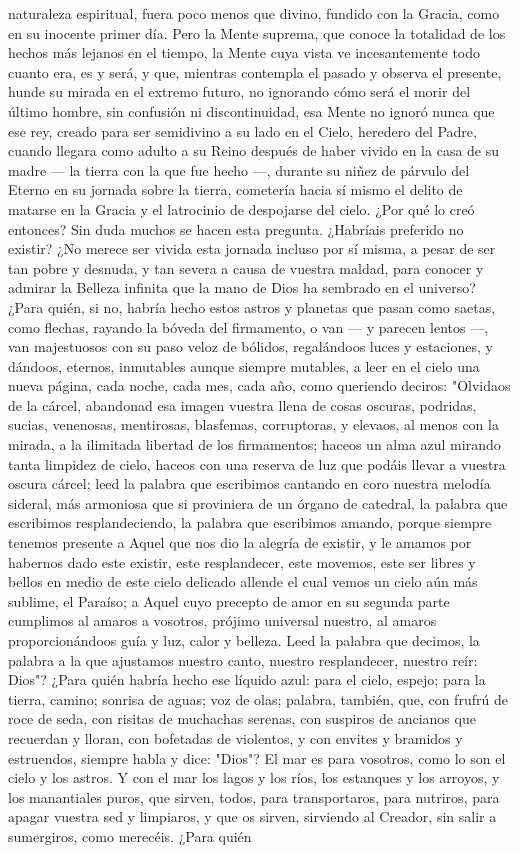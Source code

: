 \documentclass[12pt, twoside, openright]{book} %
\begin{document}
naturaleza espiritual, fuera poco menos que divino, fundido con la Gracia, como en su inocente primer día. Pero la Mente suprema, que conoce la totalidad de los hechos más lejanos en el tiempo, la Mente cuya vista ve incesantemente todo cuanto era, es y será, y que, mientras contempla el pasado y observa el presente, hunde su mirada en el extremo futuro, no ignorando cómo será el morir del último hombre, sin confusión ni discontinuidad, esa Mente no ignoró nunca que ese rey, creado para ser semidivino a su lado en el Cielo, heredero del Padre, cuando llegara como adulto a su Reino después de haber vivido en la casa de su madre — la tierra con la que fue hecho —, durante su niñez de párvulo del Eterno en su jornada sobre la tierra, cometería hacia sí mismo el delito de matarse en la Gracia y el latrocinio de despojarse del cielo. ¿Por qué lo creó entonces? Sin duda muchos se hacen esta pregunta. ¿Habríais preferido no existir? ¿No merece ser vivida esta jornada incluso por sí misma, a pesar de ser tan pobre y desnuda, y tan severa a causa de vuestra maldad, para conocer y admirar la Belleza infinita que la mano de Dios ha sembrado en el universo? ¿Para quién, si no, habría hecho estos astros y planetas que pasan como saetas, como flechas, rayando la bóveda del firmamento, o van — y parecen lentos —, van majestuosos con su paso veloz de bólidos, regalándoos luces y estaciones, y dándoos, eternos, inmutables aunque siempre mutables, a leer en el cielo una nueva página, cada noche, cada mes, cada año, como queriendo deciros: "Olvidaos de la cárcel, abandonad esa imagen vuestra llena de cosas oscuras, podridas, sucias, venenosas, mentirosas, blasfemas, corruptoras, y elevaos, al menos con la mirada, a la ilimitada libertad de los firmamentos; haceos un alma azul mirando tanta limpidez de cielo, haceos con una reserva de luz que podáis llevar a vuestra oscura cárcel; leed la palabra que escribimos cantando en coro nuestra melodía sideral, más armoniosa que si proviniera de un órgano de catedral, la palabra que escribimos resplandeciendo, la palabra que escribimos amando, porque siempre tenemos presente a Aquel que nos dio la alegría de existir, y le amamos por habernos dado este existir, este resplandecer, este movemos, este ser libres y bellos en medio de este cielo delicado allende el cual vemos un cielo aún más sublime, el Paraíso; a Aquel cuyo precepto de amor en su segunda parte cumplimos al amaros a vosotros, prójimo universal nuestro, al amaros proporcionándoos guía y luz, calor y belleza. Leed la palabra que decimos, la palabra a la que ajustamos nuestro canto, nuestro resplandecer, nuestro reír: Dios"? ¿Para quién habría hecho ese líquido azul: para el cielo, espejo; para la tierra, camino; sonrisa de aguas; voz de olas; palabra, también, que, con frufrú de roce de seda, con risitas de muchachas serenas, con suspiros de ancianos que recuerdan y lloran, con bofetadas de violentos, y con envites y bramidos y estruendos, siempre habla y dice: "Dios"? El mar es para vosotros, como lo son el cielo y los astros. Y con el mar los lagos y los ríos, los estanques y los arroyos, y los manantiales puros, que sirven, todos, para transportaros, para nutriros, para apagar vuestra sed y limpiaros, y que os sirven, sirviendo al Creador, sin salir a sumergiros, como merecéis. ¿Para quién 
\end{document}
